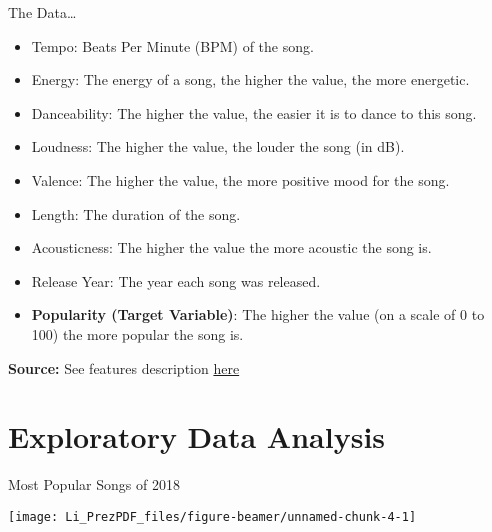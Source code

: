 \documentclass[ignorenonframetext,]{beamer}
\providecommand{\tightlist}{%
  \setlength{\itemsep}{0pt}\setlength{\parskip}{0pt}}
\begin{document}
\begin{frame}{The Data\ldots{}}
\protect\hypertarget{the-data-1}{}

\begin{itemize}
\tightlist
\item
  Tempo: Beats Per Minute (BPM) of the song.\\
\item
  Energy: The energy of a song, the higher the value, the more
  energetic.\\
\item
  Danceability: The higher the value, the easier it is to dance to this
  song.\\
\item
  Loudness: The higher the value, the louder the song (in dB).\\
\item
  Valence: The higher the value, the more positive mood for the song.\\
\item
  Length: The duration of the song.\\
\item
  Acousticness: The higher the value the more acoustic the song is.\\
\item
  Release Year: The year each song was released.\\
\item
  \textbf{Popularity (Target Variable)}: The higher the value (on a
  scale of 0 to 100) the more popular the song is.
\end{itemize}

\textbf{Source:} See features description
\href{http://static.echonest.com/SortYourMusic/}{here}

\end{frame}

\hypertarget{exploratory-data-analysis}{%
\section{Exploratory Data Analysis}\label{exploratory-data-analysis}}

\begin{frame}{Most Popular Songs of 2018}
\protect\hypertarget{most-popular-songs-of-2018}{}

\begin{center}\texttt{[image: Li\_PrezPDF\_files/figure-beamer/unnamed-chunk-4-1]} \end{center}

\end{frame}
\end{document}
